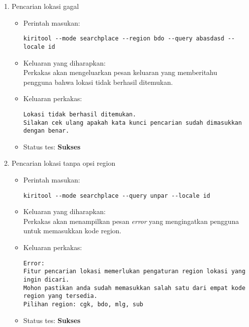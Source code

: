 \begin{enumerate}
	\item Pencarian lokasi gagal
	\begin{itemize}
		\item Perintah masukan:
		\begin{lstlisting}
kiritool --mode searchplace --region bdo --query abasdasd --locale id
		\end{lstlisting}
		\item Keluaran yang diharapkan: \\
		Perkakas akan mengeluarkan pesan keluaran yang memberitahu pengguna bahwa lokasi tidak berhasil ditemukan.
		\item Keluaran perkakas:
		\begin{lstlisting}
Lokasi tidak berhasil ditemukan.
Silakan cek ulang apakah kata kunci pencarian sudah dimasukkan dengan benar.
		\end{lstlisting}
		\item Status tes: \textbf{Sukses}
	\end{itemize}
	
	\item Pencarian lokasi tanpa opsi region
	\begin{itemize}
		\item Perintah masukan:
		\begin{lstlisting}
kiritool --mode searchplace --query unpar --locale id
		\end{lstlisting}
		\item Keluaran yang diharapkan: \\
		Perkakas akan menampilkan pesan \textit{error} yang mengingatkan pengguna untuk memasukkan kode region.
		\item Keluaran perkakas:
		\begin{lstlisting}
Error:
Fitur pencarian lokasi memerlukan pengaturan region lokasi yang ingin dicari.
Mohon pastikan anda sudah memasukkan salah satu dari empat kode region yang tersedia.
Pilihan region: cgk, bdo, mlg, sub
		\end{lstlisting}
		\item Status tes: \textbf{Sukses}
	\end{itemize}
	

\end{enumerate}
